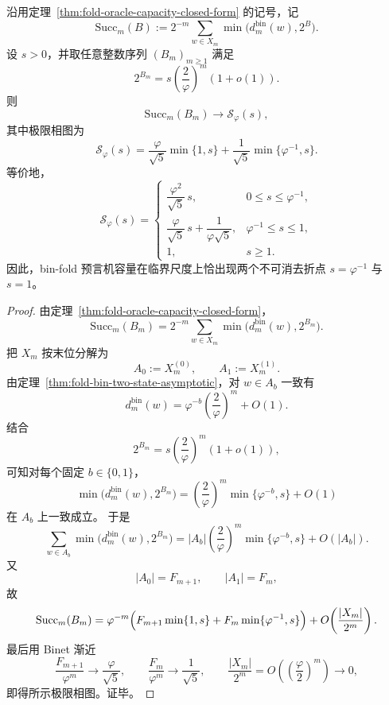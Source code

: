 \begin{theorem}\label{thm:xi-time-part55ba-critical-oracle-phase-diagram}
沿用定理~\ref{thm:fold-oracle-capacity-closed-form} 的记号，记
\[
\mathrm{Succ}_m(B):=2^{-m}\sum_{w\in X_m}\min\bigl(d_m^{\mathrm{bin}}(w),2^B\bigr).
\]
设 \(s>0\)，并取任意整数序列 \((B_m)_{m\ge 1}\) 满足
\[
2^{B_m}=s\left(\frac{2}{\varphi}\right)^m(1+o(1)).
\]
则
\[
\mathrm{Succ}_m(B_m)\longrightarrow \mathcal S_\varphi(s),
\]
其中极限相图为
\[
\mathcal S_\varphi(s)
=
\frac{\varphi}{\sqrt5}\min\{1,s\}
+
\frac{1}{\sqrt5}\min\{\varphi^{-1},s\}.
\]
等价地，
\[
\mathcal S_\varphi(s)=
\begin{cases}
\dfrac{\varphi^2}{\sqrt5}\,s, & 0\le s\le \varphi^{-1},\\[1ex]
\dfrac{\varphi}{\sqrt5}\,s+\dfrac{1}{\varphi\sqrt5}, & \varphi^{-1}\le s\le 1,\\[1ex]
1, & s\ge 1.
\end{cases}
\]
因此，bin-fold 预言机容量在临界尺度上恰出现两个不可消去折点 \(s=\varphi^{-1}\) 与 \(s=1\)。
\end{theorem}
\begin{proof}
由定理~\ref{thm:fold-oracle-capacity-closed-form}，
\[
\mathrm{Succ}_m(B_m)=2^{-m}\sum_{w\in X_m}\min\bigl(d_m^{\mathrm{bin}}(w),2^{B_m}\bigr).
\]
把 \(X_m\) 按末位分解为
\[
A_0:=X_m^{(0)},
\qquad
A_1:=X_m^{(1)}.
\]
由定理~\ref{thm:fold-bin-two-state-asymptotic}，对 \(w\in A_b\) 一致有
\[
d_m^{\mathrm{bin}}(w)=\varphi^{-b}\left(\frac{2}{\varphi}\right)^m+O(1).
\]
结合
\[
2^{B_m}=s\left(\frac{2}{\varphi}\right)^m(1+o(1)),
\]
可知对每个固定 \(b\in\{0,1\}\)，
\[
\min\bigl(d_m^{\mathrm{bin}}(w),2^{B_m}\bigr)
=
\left(\frac{2}{\varphi}\right)^m
\min\{\varphi^{-b},s\}
+O(1)
\]
在 \(A_b\) 上一致成立。
于是
\[
\sum_{w\in A_b}\min\bigl(d_m^{\mathrm{bin}}(w),2^{B_m}\bigr)
=
|A_b|\left(\frac{2}{\varphi}\right)^m\min\{\varphi^{-b},s\}+O(|A_b|).
\]
又
\[
|A_0|=F_{m+1},
\qquad
|A_1|=F_m,
\]
故
\[
\mathrm{Succ}_m(B_m)
=
\varphi^{-m}\Bigl(F_{m+1}\min\{1,s\}+F_m\min\{\varphi^{-1},s\}\Bigr)
+O\!\left(\frac{|X_m|}{2^m}\right).
\]
最后用 Binet 渐近
\[
\frac{F_{m+1}}{\varphi^m}\to \frac{\varphi}{\sqrt5},
\qquad
\frac{F_m}{\varphi^m}\to \frac{1}{\sqrt5},
\qquad
\frac{|X_m|}{2^m}=O\!\left(\left(\frac{\varphi}{2}\right)^m\right)\to 0,
\]
即得所示极限相图。证毕。
\end{proof}

